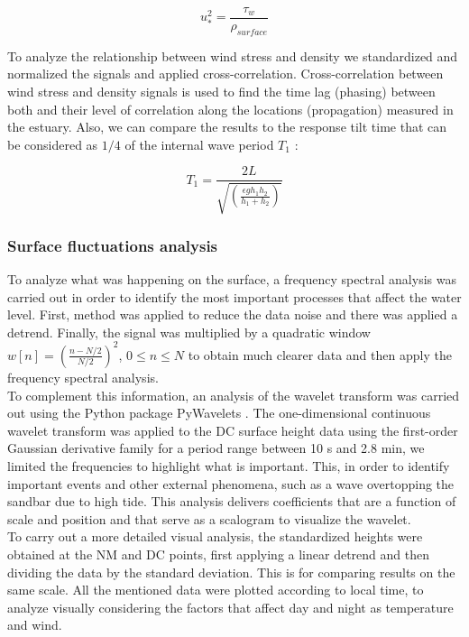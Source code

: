 \documentclass[tesis.tex]{subfiles}
\begin{document}
\begin{equation}
    u_*^2=\frac{\tau_w}{\rho_{surface}}
    \label{eq: ustar}
\end{equation}


To analyze the relationship between wind stress and density we standardized and normalized the signals and applied cross-correlation. Cross-correlation between wind stress and density signals is used to find the time lag (phasing) between both and their level of correlation along the locations (propagation) measured in the estuary. Also, we can compare the results to the response tilt time that can be considered as $1/4$ of the internal wave period $T_1$ \citep{stevens1996initial}: 

\begin{equation}
    T_1=\frac{2L}{\sqrt{(\frac{\epsilon g h_1 h_2}{h_1 + h_2})}}
    \label{eq: period}
\end{equation}

\subsubsection{Surface fluctuations analysis}

To analyze what was happening on the surface, a frequency spectral analysis was carried out in order to identify the most important processes that affect the water level. First, \cite{welch1967use} method was applied to reduce the data noise and there was applied a detrend. Finally, the signal was multiplied by a quadratic window $w[n]=\left( \frac{n-N/2}{N/2} \right)^2$, $0 \leq n \leq N$ to obtain much clearer data and then apply the frequency spectral analysis. \\

To complement this information, an analysis of the wavelet transform was carried out using the Python package PyWavelets \citep{lee2019pywavelets}. The one-dimensional continuous wavelet transform was applied to the DC surface height data using the first-order Gaussian derivative family for a period range between 10 s and 2.8 min, we limited the frequencies to highlight what is important. This, in order to identify important events and other external phenomena, such as a wave overtopping the sandbar due to high tide. This analysis delivers coefficients that are a function of scale and position and that serve as a scalogram to visualize the wavelet.\\

To carry out a more detailed visual analysis, the standardized heights were obtained at the NM and DC points, first applying a linear detrend and then dividing the data by the standard deviation. This is for comparing results on the same scale. All the mentioned data were plotted according to local time, to analyze visually considering the factors that affect day and night as temperature and wind.
\end{document}
